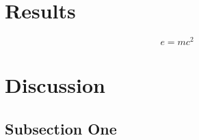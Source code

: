 \documentclass[twoside,twocolumn]{article}
\begin{document}



\section{Results}


\blindtext %

\begin{equation}
\label{eq:emc}
e = mc^2
\end{equation}

\blindtext %


\section{Discussion}

\subsection{Subsection One}
\end{document}
